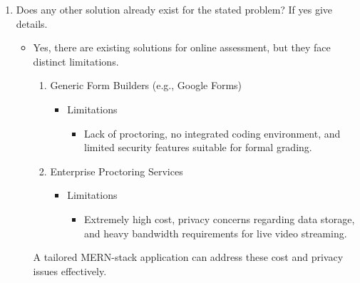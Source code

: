 \documentclass[14pt]{article}
\begin{document}
\begin{enumerate}
\item Does any other solution already exist for the stated problem? If yes give details.
\begin{itemize}
\item Yes, there are existing solutions for online assessment, but they face distinct limitations.
\begin{enumerate}
\item Generic Form Builders (e.g., Google Forms)
\begin{itemize}
\item Limitations
\begin{itemize}
\item Lack of proctoring, no integrated coding environment, and limited security features suitable for formal grading.
\end{itemize}
\end{itemize}
\item Enterprise Proctoring Services
\begin{itemize}
\item Limitations
\begin{itemize}
\item Extremely high cost, privacy concerns regarding data storage, and heavy bandwidth requirements for live video streaming.
\end{itemize}
\end{itemize}
\end{enumerate}
A tailored MERN-stack application can address these cost and privacy issues effectively.
\end{itemize}


\end{enumerate}
\end{document}
